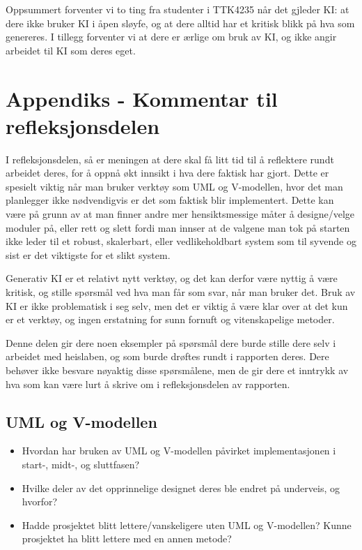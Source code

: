 Oppsummert forventer vi to ting fra studenter i TTK4235 når det gjleder KI: at dere ikke bruker KI i åpen sløyfe, og at dere alltid har et kritisk blikk på hva som genereres. I tillegg forventer vi at dere er ærlige om bruk av KI, og ikke angir arbeidet til KI som deres eget. 

\section{Appendiks - Kommentar til refleksjonsdelen}\label{app:refleksjon}

I refleksjonsdelen, så er meningen at dere skal få litt tid til å reflektere rundt arbeidet deres, for å oppnå økt innsikt i hva dere faktisk har gjort. Dette er spesielt viktig når man bruker verktøy som UML og V-modellen, hvor det man planlegger ikke nødvendigvis er det som faktisk blir implementert. Dette kan være på grunn av at man finner andre mer hensiktsmessige måter å designe/velge moduler på, eller rett og slett fordi man innser at de valgene man tok på starten ikke leder til et robust, skalerbart, eller vedlikeholdbart system som til syvende og sist er det viktigste for et slikt system. 

Generativ KI er et relativt nytt verktøy, og det kan derfor være nyttig å være kritisk, og stille spørsmål ved hva man får som svar, når man bruker det. Bruk av KI er ikke problematisk i seg selv, men det er viktig å være klar over at det kun er et verktøy, og ingen erstatning for sunn fornuft og vitenskapelige metoder.

Denne delen gir dere noen eksempler på spørsmål dere burde stille dere selv i arbeidet med heislaben, og som burde drøftes rundt i rapporten deres. Dere behøver ikke besvare nøyaktig disse spørsmålene, men de gir dere et inntrykk av hva som kan være lurt å skrive om i refleksjonsdelen av rapporten.

\subsection{UML og V-modellen}
\begin{itemize}
    \item Hvordan har bruken av UML og V-modellen påvirket implementasjonen i start-, midt-, og sluttfasen?
    \item Hvilke deler av det opprinnelige designet deres ble endret på underveis, og hvorfor?
    \item Hadde prosjektet blitt lettere/vanskeligere uten UML og V-modellen? Kunne prosjektet ha blitt lettere med en annen metode?
\end{itemize}

